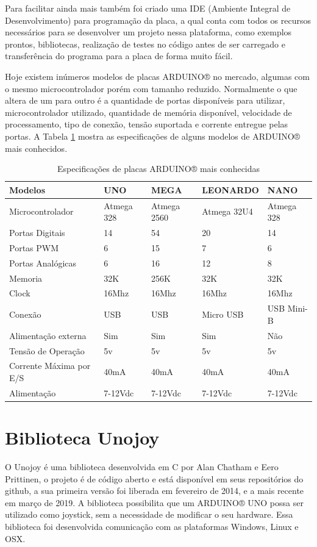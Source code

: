 \documentclass[
	12pt,			%
	openright,		%
	oneside,			%
	a4paper,			%
	chapter=TITLE,		%
	english,			%
	brazil,			%
	]{abntex2}
\begin{document}
Para facilitar ainda mais também foi criado uma IDE (Ambiente Integral de Desenvolvimento) para programação da placa, a qual conta com todos os recursos necessários para se desenvolver um projeto nessa plataforma, como exemplos prontos, bibliotecas, realização de testes no código antes de ser carregado e transferência do programa para a placa de forma muito fácil.

Hoje existem inúmeros modelos de placas ARDUINO® no mercado, algumas com o mesmo microcontrolador porém com tamanho reduzido. Normalmente o que altera de um para outro é a quantidade de portas disponíveis para utilizar, microcontrolador utilizado, quantidade de memória disponível, velocidade de processamento, tipo de conexão, tensão suportada e corrente entregue pelas portas. A Tabela \ref{tab:tab-2} mostra as especificações de alguns modelos de ARDUINO® mais conhecidos.

\begin{table}[H]
\caption{Especificações de placas ARDUINO® mais conhecidas}
\label{tab:tab-2}
{
\centering
\footnotesize
\begin{tabular}{|p{5cm}|p{2cm}|p{2cm}|p{3cm}|p{2cm}|}
\hline
\textbf{Modelos} & UNO & MEGA & LEONARDO & NANO \\
\hline
Microcontrolador & Atmega 328 & Atmega 2560 & Atmega 32U4 & Atmega 328 \\
\hline
Portas Digitais & 14 & 54 & 20 & 14 \\
\hline
Portas PWM & 6 & 15 & 7 & 6 \\
\hline
Portas Analógicas & 6 & 16 & 12 & 8 \\
\hline
Memoria & 32K & 256K & 32K & 32K \\
\hline
Clock & 16Mhz & 16Mhz & 16Mhz & 16Mhz \\
\hline
Conexão & USB & USB & Micro USB & USB Mini-B \\
\hline
Alimentação externa & Sim & Sim & Sim & Não \\
\hline
Tensão de Operação & 5v & 5v & 5v & 5v \\
\hline
Corrente Máxima por E/S & 40mA & 40mA & 40mA & 40mA \\
\hline
Alimentação & 7-12Vdc & 7-12Vdc & 7-12Vdc & 7-12Vdc\\
\hline
\end{tabular}
}
\end{table}

\section{Biblioteca Unojoy}
O Unojoy é uma biblioteca desenvolvida em C por Alan Chatham e Eero Prittinen, o projeto é de código aberto e está disponível em seus repositórios do github, a sua primeira versão foi liberada em fevereiro de 2014, e a mais recente em março de 2019. A biblioteca possibilita que um ARDUINO® UNO possa ser utilizado como joystick, sem a necessidade de modificar o seu hardware. Essa biblioteca foi desenvolvida comunicação com as plataformas Windows, Linux e OSX.
\end{document}
